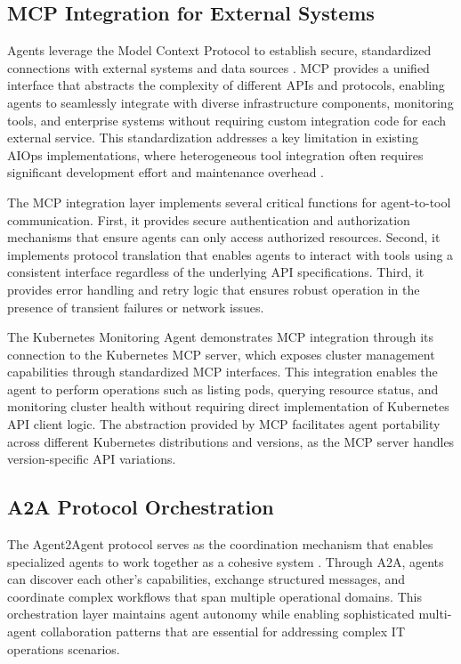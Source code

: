 \documentclass{article}
\begin{document}
\subsection{MCP Integration for External Systems}

Agents leverage the Model Context Protocol to establish secure, standardized connections with external systems and data sources \cite{anthropic2024}. MCP provides a unified interface that abstracts the complexity of different APIs and protocols, enabling agents to seamlessly integrate with diverse infrastructure components, monitoring tools, and enterprise systems without requiring custom integration code for each external service. This standardization addresses a key limitation in existing AIOps implementations, where heterogeneous tool integration often requires significant development effort and maintenance overhead \cite{notaro2021}.

The MCP integration layer implements several critical functions for agent-to-tool communication. First, it provides secure authentication and authorization mechanisms that ensure agents can only access authorized resources. Second, it implements protocol translation that enables agents to interact with tools using a consistent interface regardless of the underlying API specifications. Third, it provides error handling and retry logic that ensures robust operation in the presence of transient failures or network issues.

The Kubernetes Monitoring Agent demonstrates MCP integration through its connection to the Kubernetes MCP server, which exposes cluster management capabilities through standardized MCP interfaces. This integration enables the agent to perform operations such as listing pods, querying resource status, and monitoring cluster health without requiring direct implementation of Kubernetes API client logic. The abstraction provided by MCP facilitates agent portability across different Kubernetes distributions and versions, as the MCP server handles version-specific API variations.

\subsection{A2A Protocol Orchestration}

The Agent2Agent protocol serves as the coordination mechanism that enables specialized agents to work together as a cohesive system \cite{openai2024}. Through A2A, agents can discover each other's capabilities, exchange structured messages, and coordinate complex workflows that span multiple operational domains. This orchestration layer maintains agent autonomy while enabling sophisticated multi-agent collaboration patterns that are essential for addressing complex IT operations scenarios.
\end{document}
